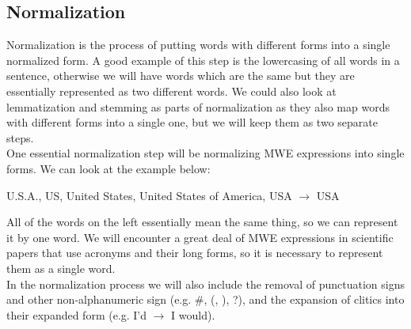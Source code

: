 \documentclass[12pt]{article}
\numberwithin{equation}{section}
\begin{document}
\begin{spacing}{1.5}
	\subsection{Normalization}
	Normalization is the process of putting words with different forms into a single normalized form. A good example of this step is the lowercasing of all words in a sentence, otherwise we will have words which are the same but they are essentially represented as two different words. We could also look at lemmatization and stemming as parts of normalization as they also map words with different forms into a single one, but we will keep them as two separate steps. \\
	One essential normalization step will be normalizing MWE expressions into single forms. We can look at the example below:
	\begin{center}
		U.S.A., US, United States, United States of America, USA $\rightarrow$ USA
	\end{center}
	All of the words on the left essentially mean the same thing, so we can represent it by one word. We will encounter a great deal of MWE expressions in scientific papers that use acronyms and their long forms, so it is necessary to represent them as a single word. \\ 
	In the normalization process we will also include the removal of punctuation signs and other non-alphanumeric sign (e.g. \#, (, ), ?), and the expansion of clitics into their expanded form (e.g. I'd $\rightarrow$ I would).
	

\end{spacing}
\end{document}

